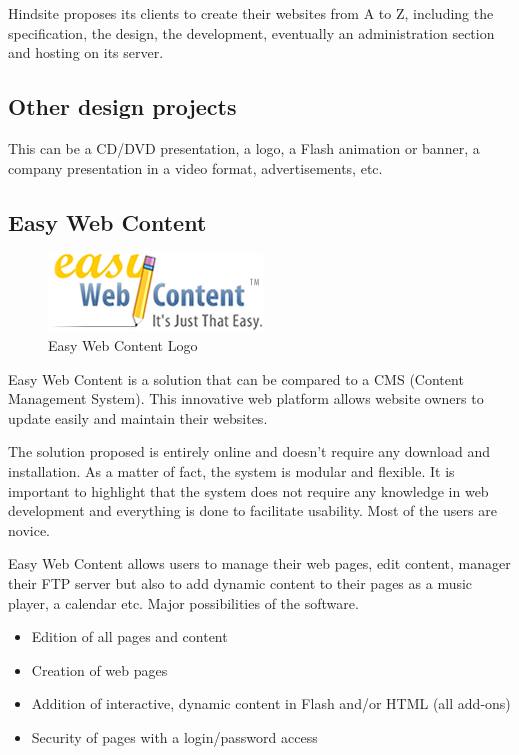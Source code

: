 Hindsite proposes its clients to create their websites from A to Z, including the
specification, the design, the development, eventually an administration
section and hosting on its server.

\subsection{Other design projects}

This can be a CD/DVD presentation, a logo, a Flash animation or banner, a
company presentation in a video format, advertisements, etc.

\subsection{Easy Web Content}
\begin{figure}[!ht]
\centering
\includegraphics[width=.30\textwidth]{img/ewc.png}
\caption{Easy Web Content Logo}
\label{figure:ewc-logo}
\end{figure}

Easy Web Content is a solution that can be compared to a CMS (Content
Management System). This innovative web platform allows website owners to
update easily and maintain their websites.

The solution proposed is entirely online and doesn’t require any download and
installation. As a matter of fact, the system is modular and flexible.
It is important to highlight that the system does not require any knowledge in web
development and everything is done to facilitate usability. Most of the users are
novice.

Easy Web Content allows users to manage their web pages, edit content, manager
their FTP server but also to add dynamic content to their pages as a music player, a calendar etc. Major possibilities of the software.

\begin{itemize}
\item Edition of all pages and content
\item Creation of web pages
\item Addition of interactive, dynamic content in Flash and/or HTML (all add-ons)
\item Security of pages with a login/password access
\end{itemize}


